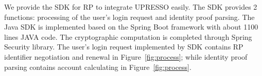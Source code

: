 We provide the SDK for RP to integrate UPRESSO easily. The SDK provides 2 functions:  %
processing of the user's login request and  identity proof parsing. The Java SDK is implemented based on the Spring Boot framework  with about 1100 lines JAVA code. The cryptographic computation is completed through Spring Security library.
The user's login request implemented by SDK contains RP identifier negotiation and renewal in Figure~\ref{fig:process}; while identity proof parsing contains account calculating in Figure~\ref{fig:process}.






\begin{comment}
\subsection{Prototype Implementation}

\noindent\textbf{Cross-Origin Resource Sharing (CORS).} The chrome extension needs to construct cross-origin requests to communicate with the RP and IdP, which is forbidden by default by the same-origin security policy. UPRESSO adopts CORS to achieve this cross-origin communication. In details, we requires the RP and IdP to specify \verb+chrome-extension://chrome-id+ in the \verb+Access-Control-Allow-Origin+ field of its response header, which makes the request pass the permission checks at the browser. As \verb+chrome-id+ is unique assigned by the Google, no other (malicious) entity can perform the cross-origin communication.

\noindent\textbf{307 Redirect. }It has been discussed in~\cite{FettKS16} that IdP might redirect the user to the RP immediately after the user inputs the credentials. For example, the HTTP response to the user's POST message with \verb+username+ and \verb+password+ might be the redirection to RP carrying user's identity proof. That is, as long as the 307 status code is used for this redirection, the user's credentials are also transmitted to the RP. However, in UPRESSO the redirections are intercepted by the user agent and rebuild the HTTP GET request to RP or IdP which is unable to leak the POST data of the user.



\noindent\textbf{Cross-Site Request Forgery (CSRF). } The CSRF attack might lead the user to access the malicious url provided by the adversary's web page, through which the adversary might lead the honest user to upload the adversary's \verb+ID token+ to the RP. However, in UPRESSO the cross origin request should be repudiated by both RP and IdP excepted the request from the origin of the user agent, which is able to prevent the CSRF attack.



\end{comment}
